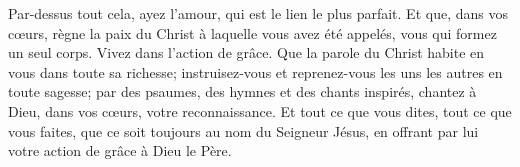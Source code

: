 Par-dessus tout cela, ayez l’amour, qui est le lien le plus parfait.
Et que, dans vos cœurs,
	règne la paix du Christ à laquelle vous avez été appelés,
	vous qui formez un seul corps.
	Vivez dans l’action de grâce.
Que la parole du Christ habite en vous dans toute sa richesse;
	instruisez-vous et reprenez-vous les uns les autres en toute sagesse;
	par des psaumes, des hymnes et des chants inspirés,
	chantez à Dieu, dans vos cœurs, votre reconnaissance.
Et tout ce que vous dites, tout ce que vous faites,
	que ce soit toujours au nom du Seigneur Jésus,
	en offrant par lui votre action de grâce à Dieu le Père.
